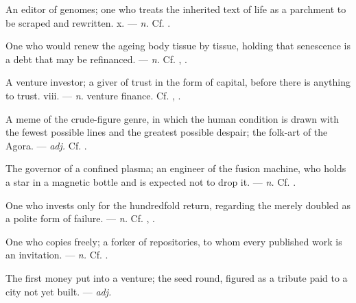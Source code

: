  An editor of genomes; one who treats the inherited text of life as a parchment to be scraped and rewritten.   x. ---  \textit{n.} Cf. .

 One who would renew the ageing body tissue by tissue, holding that senescence is a debt that may be refinanced. ---  \textit{n.} Cf. , .

 A venture investor; a giver of trust in the form of capital, before there is anything to trust.   viii. ---  \textit{n.} venture finance. Cf. , .

 A meme of the crude-figure genre, in which the human condition is drawn with the fewest possible lines and the greatest possible despair; the folk-art of the Agora. ---  \textit{adj.} Cf. .

 The governor of a confined plasma; an engineer of the fusion machine, who holds a star in a magnetic bottle and is expected not to drop it. ---  \textit{n.} Cf. .

 One who invests only for the hundredfold return, regarding the merely doubled as a polite form of failure.  ---  \textit{n.} Cf. , .

 One who copies freely; a forker of repositories, to whom every published work is an invitation. ---  \textit{n.} Cf. .

 The first money put into a venture; the seed round, figured as a tribute paid to a city not yet built.   ---  \textit{adj.}

